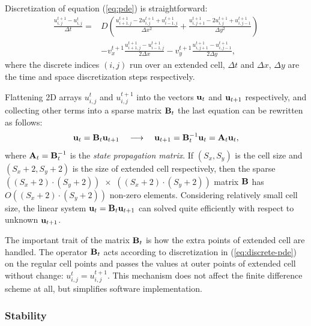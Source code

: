 \documentclass[acmsmall,review,anonymous]{acmart}\settopmatter{printfolios=true,printccs=false,printacmref=false}
\begin{document}
\newcommand{\myu}[3]{u_{{#1},{#2}}^{#3}}
Discretization of equation (\ref{eq:pde}) is straightforward: 
\begin{equation}
\begin{aligned}
\frac{\myu{i}{j}{t+1} - \myu{i}{j}{t}}{\Delta t} = {} &
D \left(
\frac{\myu{i+1}{j}{t+1} - 2\myu{i}{j}{t+1} + \myu{i-1}{j}{t+1}}{\Delta{x}^2} +
\frac{\myu{i}{j+1}{t+1} - 2\myu{i}{j}{t+1} + \myu{i}{j-1}{t+1}}{\Delta{y}^2}
\right) \\
&
-v_x^{t+1} \frac{\myu{i+1}{j}{t+1} - \myu{i-1}{j}{t+1}}{2\Delta{x}} 
-v_y^{t+1} \frac{\myu{i}{j+1}{t+1} - \myu{i}{j-1}{t+1}}{2\Delta{y}},
\end{aligned}
\label{eq:discrete-pde}
\end{equation}
where the discrete indices $(i,j)$ run over an extended cell, $\Delta{t}$ and $\Delta{x}$, $\Delta{y}$ are the time and space discretization steps respectively.

Flattening 2D arrays $\myu{i}{j}{t}$ and $\myu{i}{j}{t+1}$ into the vectors ${\bf u}_{t}$ and ${\bf u}_{t+1}$ respectively, and collecting other terms into a sparse matrix ${\bf B}_t$ the last equation can be rewritten as follows:
\begin{equation}
{\bf u}_{t} = {\bf B}_t {\bf u}_{t+1} \quad \longrightarrow \quad
{\bf u}_{t+1} = {\bf B}^{-1}_t {\bf u}_{t} = {\bf A}_t {\bf u}_{t},
\label{eq:state-propag}
\end{equation}
where ${\bf A}_t = {\bf B}^{-1}_t$ is the \textit{state propagation matrix}. If $(S_x,S_y)$ is the cell size and $(S_x\!+\!2,S_y\!+\!2)$ is the size of extended cell respectively, then the sparse $((S_x\!+\!2)\!\cdot\!(S_y\!+\!2))\,\,{\times}\,\,((S_x\!+\!2)\!\cdot\!(S_y\!+\!2))$ matrix ${\bf B}$ has $O((S_x\!+\!2)\!\cdot\!(S_y\!+\!2))$ non-zero elements. Considering relatively small cell size, the linear system ${\bf u}_{t} = {\bf B}_t {\bf u}_{t+1}$ can solved quite efficiently with respect to unknown ${\bf u}_{t+1}$.

The important trait of the matrix ${\bf B}_t$ is how the extra points of extended cell are handled. The operator ${\bf B}_t$ acts according to discretization in (\ref{eq:discrete-pde}) on the regular cell points and passes the values at outer points of extended cell without change: $\myu{i}{j}{t} = \myu{i}{j}{t+1}$. This mechanism does not affect the finite difference scheme at all, but simplifies software implementation.
\renewcommand{\myu}{}

\subsubsection{Stability}
\end{document}
